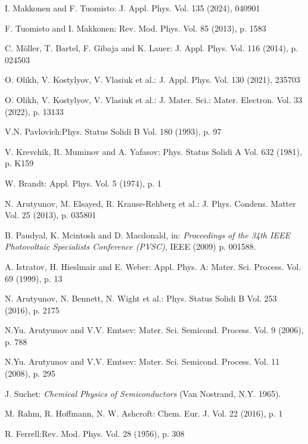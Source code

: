 \documentclass{ttp}
\begin{document}
\begin{thebibliography}{99}
 I. Makkonen and F. Tuomisto: J. Appl. Phys. Vol. 135 (2024), 040901

 F. Tuomisto and I. Makkonen: Rev. Mod. Phys. Vol. 85 (2013), p. 1583


 C. M\"{o}ller, T. Bartel, F. Gibaja and K. Lauer: J. Appl. Phys. Vol. 116 (2014), p. 024503

 O. Olikh, V. Kostylyov, V. Vlasiuk et al.: J. Appl. Phys. Vol. 130 (2021), 235703

 O. Olikh, V. Kostylyov, V. Vlasiuk et al.: J. Mater. Sci.: Mater. Electron. Vol. 33 (2022), p. 13133

 V.N. Pavlovich:Phys. Status Solidi B Vol. 180 (1993), p. 97

  V. Krevchik, R. Muminov and A. Yafasov: Phys. Status Solidi A Vol. 632 (1981), p. K159


W. Brandt: Appl. Phys. Vol. 5 (1974), p. 1

 N. Arutyunov, M. Elsayed, R. Krause-Rehberg et al.: J. Phys. Condens. Matter Vol. 25 (2013), p. 035801

 B. Paudyal, K. Mcintosh and D. Macdonald, in: \textit{Proceedings of the 34th
IEEE Photovoltaic Specialists Conference (PVSC)}, IEEE (2009) p. 001588.

 A. Istratov, H. Hieslmair and E. Weber: Appl. Phys. A: Mater. Sci. Process. Vol. 69 (1999), p. 13

  N. Arutyunov, N. Bennett, N. Wight et al.: Phys. Status Solidi B Vol. 253 (2016), p. 2175

 N.Yu. Arutyunov and V.V. Emtsev: Mater. Sci. Semicond. Process. Vol. 9 (2006), p. 788

 N.Yu. Arutyunov and V.V. Emtsev: Mater. Sci. Semicond. Process. Vol. 11 (2008), p. 295

 J. Suchet: \textit{Chemical Physics of Semiconductors }(Van Nostrand, N.Y. 1965).

 M. Rahm, R. Hoffmann, N. W. Ashcroft: Chem. Eur. J. Vol. 22 (2016), p. 1

 R. Ferrell:Rev. Mod. Phys. Vol. 28 (1956), p. 308

\end{thebibliography}
\end{document}
